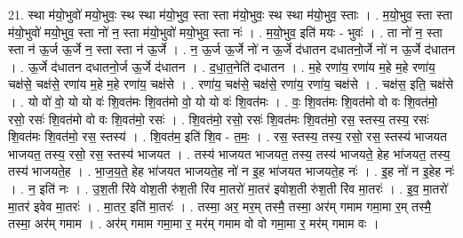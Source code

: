 \documentclass[17pt]{extarticle}
\begin{document}
21. स्था म॑यो॒भुवो॑ मयो॒भुवः॒ स्थ स्था म॑यो॒भुव॒ स्ता स्ता म॑यो॒भुवः॒ स्थ स्था म॑यो॒भुव॒ स्ताः । . म॒यो॒भुव॒ स्ता स्ता म॑यो॒भुवो॑ मयो॒भुव॒ स्ता नो॑ न॒ स्ता म॑यो॒भुवो॑ मयो॒भुव॒ स्ता नः॑ । . म॒यो॒भुव॒ इति॑ मयः - भुवः॑ । . ता नो॑ न॒ स्ता स्ता न॑ ऊ॒र्ज ऊ॒र्जे न॒ स्ता स्ता न॑ ऊ॒र्जे । . न॒ ऊ॒र्ज ऊ॒र्जे नो॑ न ऊ॒र्जे द॑धातन दधातनो॒र्जे नो॑ न ऊ॒र्जे द॑धातन । . ऊ॒र्जे द॑धातन दधातनो॒र्ज ऊ॒र्जे द॑धातन । . द॒धा॒त॒नेति॑ दधातन । . म॒हे रणा॑य॒ रणा॑य म॒हे म॒हे रणा॑य॒ चक्ष॑से॒ चक्ष॑से॒ रणा॑य म॒हे म॒हे रणा॑य॒ चक्ष॑से । . रणा॑य॒ चक्ष॑से॒ चक्ष॑से॒ रणा॑य॒ रणा॑य॒ चक्ष॑से । . चक्ष॑स॒ इति॒ चक्ष॑से । . यो वो॑ वो॒ यो यो वः॑ शि॒वत॑मः शि॒वत॑मो वो॒ यो यो वः॑ शि॒वत॑मः । . वः॒ शि॒वत॑मः शि॒वत॑मो वो वः शि॒वत॑मो॒ रसो॒ रसः॑ शि॒वत॑मो वो वः शि॒वत॑मो॒ रसः॑ । . शि॒वत॑मो॒ रसो॒ रसः॑ शि॒वत॑मः शि॒वत॑मो॒ रस॒ स्तस्य॒ तस्य॒ रसः॑ शि॒वत॑मः शि॒वत॑मो॒ रस॒ स्तस्य॑ । . शि॒वत॑म॒ इति॑ शि॒व - त॒मः॒ । . रस॒ स्तस्य॒ तस्य॒ रसो॒ रस॒ स्तस्य॑ भाजयत भाजयत॒ तस्य॒ रसो॒ रस॒ स्तस्य॑ भाजयत । . तस्य॑ भाजयत भाजयत॒ तस्य॒ तस्य॑ भाजयते॒ हेह भा॑जयत॒ तस्य॒ तस्य॑ भाजयते॒ह । . भा॒ज॒य॒ते॒ हेह भा॑जयत भाजयते॒ह नो॑ न इ॒ह भा॑जयत भाजयते॒ह नः॑ । . इ॒ह नो॑ न इ॒हेह नः॑ । . न॒ इति॑ नः । . उ॒श॒ती रि॑वे वोश॒ती रु॑श॒ती रि॑व मा॒तरो॑ मा॒तर॑ इवोश॒ती रु॑श॒ती रि॑व मा॒तरः॑ । . इ॒व॒ मा॒तरो॑ मा॒तर॑ इवेव मा॒तरः॑ । . मा॒तर॒ इति॑ मा॒तरः॑ । . तस्मा॒ अर॒ मर॒म् तस्मै॒ तस्मा॒ अर॑म् गमाम गमा॒मा र॒म् तस्मै॒ तस्मा॒ अर॑म् गमाम । . अर॑म् गमाम गमा॒मा र॒ मर॑म् गमाम वो वो गमा॒मा र॒ मर॑म् गमाम वः । \newline
\end{document}
